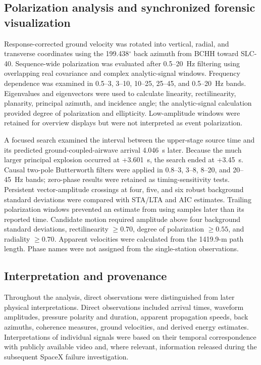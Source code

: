 \documentclass[]{seismica}
\begin{document}
\subsection{Polarization analysis and synchronized forensic visualization}
\label{sec:methods_polarization}

Response-corrected ground velocity was rotated into vertical, radial, and
transverse coordinates using the 199.438$^\circ$ back azimuth from BCHH toward
SLC-40. Sequence-wide polarization was evaluated after 0.5--20~Hz filtering
using overlapping real covariance and complex analytic-signal windows.
Frequency dependence was examined in 0.5--3, 3--10, 10--25, 25--45, and
0.5--20~Hz bands. Eigenvalues and eigenvectors were used to calculate
linearity, rectilinearity, planarity, principal azimuth, and incidence angle;
the analytic-signal calculation provided degree of polarization and
ellipticity. Low-amplitude windows were retained for overview displays but were
not interpreted as event polarization.

A focused search examined the interval between the upper-stage source time and
its predicted ground-coupled-airwave arrival 4.046~s later. Because the much
larger principal explosion occurred at +3.601~s, the search ended at +3.45~s.
Causal two-pole Butterworth filters were applied in 0.8--3, 3--8, 8--20, and
20--45~Hz bands; zero-phase results were retained as timing-sensitivity tests.
Persistent vector-amplitude crossings at four, five, and six robust background
standard deviations were compared with STA/LTA and AIC estimates. Trailing
polarization windows prevented an estimate from using samples later than its
reported time. Candidate motion required amplitude above four background
standard deviations, rectilinearity $\geq0.70$, degree of polarization
$\geq0.55$, and radiality $\geq0.70$. Apparent velocities were calculated from
the 1419.9-m path length. Phase names were not assigned from the single-station
observations.

\subsection{Interpretation and provenance}

Throughout the analysis, direct observations were distinguished from later physical interpretations. Direct observations included arrival times, waveform amplitudes, pressure polarity and duration, apparent propagation speeds, back azimuths, coherence measures, ground velocities, and derived energy estimates. Interpretations of individual signals were based on their temporal correspondence with publicly available video and, where relevant, information released during the subsequent SpaceX failure investigation.
\end{document}
